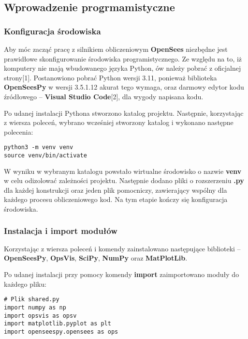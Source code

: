\subsection{Wprowadzenie progrmamistyczne}

\subsubsection{Konfiguracja środowiska}

Aby móc zacząć pracę z silnikiem obliczeniowym \textbf{OpenSees} niezbędne jest prawidłowe skonfigurowanie środowiska programistycznego.
Ze względu na to, iż komputery nie mają wbudowanego języka Python, ów należy pobrać z oficjalnej strony[1].
Postanowiono pobrać Python wersji 3.11, ponieważ biblioteka \textbf{OpenSeesPy} w wersji 3.5.1.12 akurat tego wymaga,
oraz darmowy edytor kodu źródłowego – \textbf{Visual Studio Code}[2], dla wygody napisana kodu.

Po udanej instalacji Pythona stworzono katalog projektu.
Następnie, korzystając z wiersza poleceń, wybrano wcześniej stworzony katalog i wykonano następne polecenia:

\begin{lstlisting}
python3 -m venv venv
source venv/bin/activate
\end{lstlisting}

W wyniku w wybranym katalogu powstało wirtualne środowisko o nazwie \textbf{venv} w celu odizolować zależności projektu.
Następnie dodano pliki o rozszerzeniu \textbf{.py} dla każdej konstrukcji oraz jeden plik pomocniczy, zawierający wspólny
dla każdego procesu obliczeniowego kod.
Na tym etapie kończy się konfiguracja środowiska.

\subsubsection{Instalacja i import modułów}

Korzystając z wiersza poleceń i komendy  zainstalowano następujące biblioteki –
\textbf{OpenSeesPy}, \textbf{OpsVis}, \textbf{SciPy}, \textbf{NumPy} oraz \textbf{MatPlotLib}.

Po udanej instalacji przy pomocy komendy \textbf{import} zaimportowano moduły do każdego pliku:

\begin{lstlisting}
# Plik shared.py
import numpy as np
import opsvis as opsv
import matplotlib.pyplot as plt
import openseespy.opensees as ops
\end{lstlisting}


